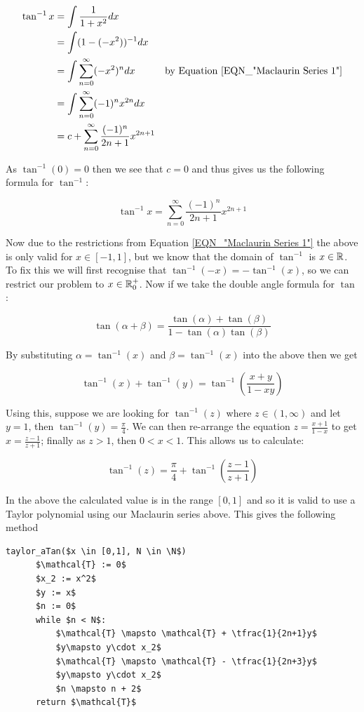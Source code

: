 {\begin{displaymath}
\begin{align*}
	\tan^{-1} x &= \int \frac{1}{1+x^2} dx\\
		&= \int (1 - (-x^2))^{-1} dx\\
		&= \int \sum_{n=0}^\infty (-x^2)^n dx &\textrm{by Equation \ref{EQN_"Maclaurin Series 1"}}\\
		&= \int \sum_{n=0}^\infty (-1)^nx^{2n} dx\\
		&= c + \sum_{n=0}^\infty \frac{(-1)^n}{2n+1}x^{2n+1}
\end{align*}
\end{displaymath}

As \(\tan^{-1} (0) = 0\) then we see that \(c = 0\) and thus gives us the following formula for \(\tan^{-1}\):

\[\tan^{-1} x = \sum_{n=0}^\infty \frac{(-1)^n}{2n+1}x^{2n+1}\]

Now due to the restrictions from Equation \ref{EQN_"Maclaurin Series 1"} the above is only valid for \(x \in [-1, 1]\), but we know that the domain of \(\tan^{-1}\) is \(x \in \mathbb{R}\). To fix this we will first recognise that \(\tan^{-1}(-x) = -\tan^{-1}(x)\), so we can restrict our problem to \(x \in \mathbb{R}^+_0\). Now if we take the double angle formula for \(\tan\):

\[\tan(\alpha + \beta) = \frac{\tan(\alpha) + \tan(\beta)}{1 - \tan(\alpha)\tan(\beta)}\]

By substituting \(\alpha = \tan^{-1}(x)\) and \(\beta = \tan^{-1}(x)\) into the above then we get

\[\tan^{-1}(x) + \tan^{-1}(y) = \tan^{-1}\left(\frac{x + y}{1 - xy}\right)\]

Using this, suppose we are looking for \(\tan^{-1}(z)\) where \(z \in (1, \infty)\) and let \(y = 1\), then \(\tan^{-1}(y) = \frac{\pi}{4}\). We can then re-arrange the equation \(z = \frac{x + 1}{1 - x}\) to get \(x = \frac{z - 1}{z + 1}\); finally as \(z > 1\), then \(0 < x < 1\). This allows us to calculate:

\[\tan^{-1}(z) = \frac{\pi}{4} + \tan^{-1}\left(\frac{z-1}{z+1}\right)\]

In the above the calculated value is in the range \([0, 1]\) and so it is valid to use a Taylor polynomial using our Maclaurin series above. This gives the following method

\begin{lstlisting}[caption={Taylor Method for \(\tan^{-1}\)},label={PCD_"Taylor aTan"}]
  taylor_aTan($x \in [0,1], N \in \N$)
      $\mathcal{T} := 0$
      $x_2 := x^2$
      $y := x$
      $n := 0$
      while $n < N$:
          $\mathcal{T} \mapsto \mathcal{T} + \tfrac{1}{2n+1}y$
          $y\mapsto y\cdot x_2$
          $\mathcal{T} \mapsto \mathcal{T} - \tfrac{1}{2n+3}y$
          $y\mapsto y\cdot x_2$
          $n \mapsto n + 2$
      return $\mathcal{T}$
\end{lstlisting}

}

